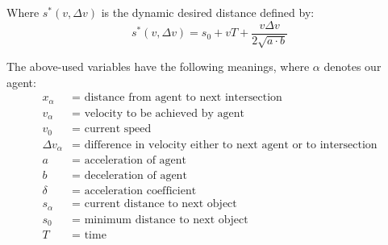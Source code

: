 Where $s^*(v, \Delta v)$ is the dynamic desired distance defined by:
\begin{equation*}
s^*(v, \Delta v) = s_0 + v T +  \frac{v\Delta v}{2\sqrt{a\cdot b}}
\end{equation*}

The above-used variables have the following meanings, where $\alpha$ denotes our agent:
\begin{align*}
x_\alpha &= \text{ distance from agent to next intersection}\\
v_\alpha &= \text{ velocity to be achieved by agent}\\
v_0 &= \text{ current speed}\\
\Delta v_\alpha &= \text{ difference in velocity either to next agent or to intersection}\\
a &= \text{ acceleration of agent}\\
b &= \text{ deceleration of agent}\\
\delta &= \text{ acceleration coefficient}\\
s_\alpha &= \text{ current distance to next object}\\
s_0 &= \text{ minimum distance to next object}\\
T &= \text{ time}
\end{align*}

